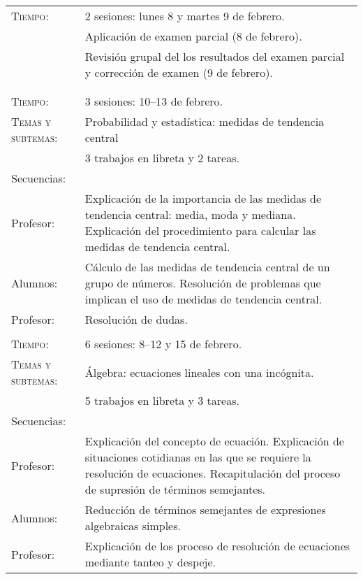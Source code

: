 \documentclass[letterpaper,10pt]{article}
\begin{document}
\begin{tabular}[t]{R{0.25\textwidth}p{0.71\textwidth}}
    \textsc{Tiempo:}& 2 sesiones: lunes 8 y martes 9  de febrero. \\
            & {\Large \sc Aplicaci\'on de examen parcial} (8 de febrero). \\           
            & Revisi\'on grupal del los resultados del examen parcial y
            correcci\'on de examen (9 de febrero).\\
\\ \hline \\
    \textsc{Tiempo:}           & 3 sesiones: 10--13  de febrero. \\
    \textsc{Temas y subtemas:} & Probabilidad y estad\'istica: medidas de
    tendencia central \\
     & 3 trabajos en libreta y 2 tareas. \\
    \large{\sc Secuencias:} \\
    Profesor:    & Explicaci\'on de la importancia de las medidas de tendencia
    central: media, moda y mediana. Explicaci\'on del procedimiento para 
    calcular las medidas de tendencia central. \\
    Alumnos:     & C\'alculo de las medidas de tendencia central de un grupo de 
    n\'umeros. Resoluci\'on de problemas que implican el uso de medidas de
    tendencia central. \\
    Profesor:   & Resoluci\'on de dudas.
\\ \hline \\
    \textsc{Tiempo:}           & 6 sesiones: 8--12 y 15 de febrero. \\
    \textsc{Temas y subtemas:} & \'Algebra: ecuaciones lineales con una
    inc\'ognita. \\
     & 5 trabajos en libreta y 3 tareas. \\
    \large{\sc Secuencias:} \\
    Profesor:    & Explicaci\'on del concepto de ecuaci\'on. Explicaci\'on de 
    situaciones cotidianas en las que se requiere la resoluci\'on de ecuaciones.
    Recapitulaci\'on del proceso de supresi\'on de t\'erminos semejantes. \\
    Alumnos:    & Reducci\'on de t\'erminos semejantes de expresiones 
    algebraicas simples.\\
    Profesor:   & Explicaci\'on de los proceso de resoluci\'on de ecuaciones 
    mediante tanteo y despeje. \\

\end{tabular}
\end{document}
